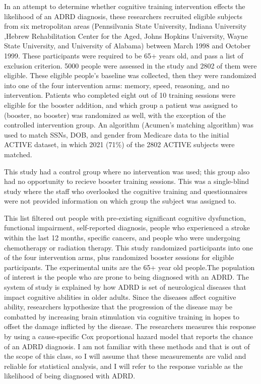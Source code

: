 \documentclass[11pt]{article}
\begin{document}
In an attempt to determine whether cognitive training intervention effects the likelihood of an ADRD diagnosis, these researchers recruited eligible subjects from six metropolitan areas (Pennsilvania State University, Indiana University ,Hebrew Rehabilitation Center for the Aged, Johns Hopkins University, Wayne State University, and University of Alabama) between March 1998 and October 1999.
These participants were required to be 65+ years old, and pass a list of exclusion criterion. 5000 people were assessed in the study and 2802 of them were eligible. These eligible people's baseline was collected, then they were randomized into one of the four intervention arms: memory, speed, reasoning, and no intervention. Patients who completed eight out of 10 training sessions were eligible for the booster addition, and which group a patient was assigned to (booster, no booster) was randomized as well, with the exception of the controlled intervention group. An algorithm (Acumen's matching algorithm) was used to match SSNs, DOB, and gender from Medicare data to the initial ACTIVE dataset, in which 2021 (71\%) of the 2802 ACTIVE subjects were matched.

This study had a control group where no intervention was used; this group also had no opportunity to recieve booster training sessions. This was a single-blind study where the staff who overlooked the cognitive training and questionnaires were not provided information on which group the subject was assigned to.

This list filtered out people with pre-existing significant cognitive dysfunction, functional impairment, self-reported diagnosis, people who experienced a stroke within the last 12 months, specific cancers, and people who were undergoing chemotherapy or radiation therapy.
This study randomized participants into one of the four intervention arms, plus randomized booster sessions for eligible participants. The experimental units are the 65+ year old people.The population of interest is the people who are prone to being diagnosed with an ADRD. The system of study is explained by how ADRD is set of neurological diseases that impact cognitive abilities in older adults. Since the diseases affect cognitive ability, researchers hypothesize that the progression of the disease may be combatted by increasing brain stimulation via cognitive training in hopes to offset the damage inflicted by the disease. The researchers measures this response by using a cause-specific Cox proportional hazard model that reports the chance of an ADRD diagnosis. I am not familiar with these methods and that is out of the scope of this class, so I will assume that these measurements are valid and reliable for statistical analysis, and I will refer to the response variable as the likelihood of being diagnosed with ADRD.
\end{document}

